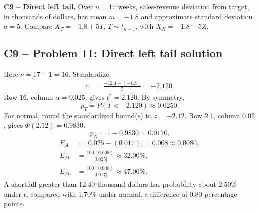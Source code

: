 {
\textbf{C9 -- Direct left tail.} Over $n=17$ weeks, sales-revenue deviation from target, in thousands of dollars, has mean $m=-1.8$ and approximate standard deviation $a=5$. Compare $X_T=-1.8+5T$, $T\sim t_{n-1}$, with $X_N=-1.8+5Z$.
\label{sol:q11}
\subsection*{C9 -- Problem 11: Direct left tail solution }
Here $\nu=17-1=16$. Standardize:
\[
\begin{aligned}
c&=\frac{-12.4-(-1.8)}{5}=-2.120.
\end{aligned}
\]
Row $16$, column $\alpha=0.025$, gives $t^*=2.120$. 
By symmetry,
\[
p_T=P(T<-2.120)\approx\boxed{0.0250}.
\]
For normal, round the standardized bound(s) to $z=-2.12$.
Row $2.1$, column $0.02$, gives $\Phi(2.12)=0.9830$. 
\[
p_N=1-0.9830=\boxed{0.0170}.
\]
\[
\begin{aligned}
E_{A}&=|0.025-(0.017)|=0.008\approx\boxed{0.0080},\\
E_{Pt}&=\frac{100(0.008)}{|0.025|}\approx\boxed{32.00\%},\\
E_{Pn}&=\frac{100(0.008)}{|0.017|}\approx\boxed{47.06\%}.
\end{aligned}
\]
A shortfall greater than $12.40$ thousand dollars has probability about $2.50\%$ under $t$, compared with $1.70\%$ under normal, a difference of $0.80$ percentage points.
\secInicio[][sec:q11]
}

